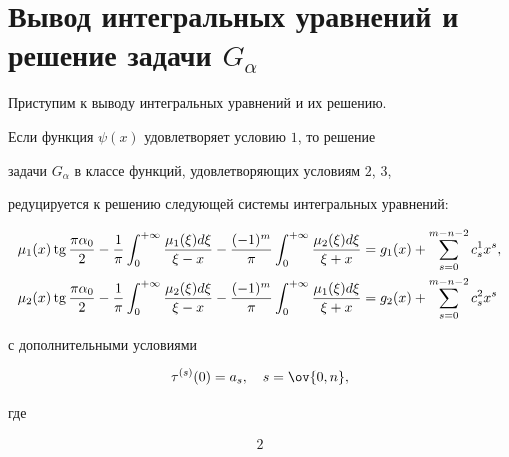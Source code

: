  


 


\section{Вывод интегральных уравнений и решение задачи $G_\alpha$} 


 


Приступим к выводу интегральных уравнений и их решению. 


 


 


\begin{thm} 


Если функция $\psi(x)$ удовлетворяет условию $1$, то решение 


задачи $G_\alpha$ в классе функций, удовлетворяющих условиям $2$, $3$, 


редуцируется к решению следующей системы интегральных уравнений\/${:}$


\begin{align} 


\mu_1(x)\tg\frac{\pi\alpha_0}{2}-\frac{1}{\pi} 


\int^{+\infty}_0\frac{\mu_1(\xi)d\xi}{\xi-x}- 


\frac{(-1)^m}{\pi}\int^{+\infty}_0 


\frac{\mu_2(\xi)d\xi}{\xi+x}&=g_1(x) 


+\sum^{m-n-2}_{s=0}c^1_s x^s,\\ 


% 


\mu_2(x)\tg\frac{\pi\alpha_0}{2}-\frac{1}{\pi} 


\int^{+\infty}_0\frac{\mu_2(\xi)d\xi}{\xi-x}- 


\frac{(-1)^m}{\pi}\int^{+\infty}_0 


\frac{\mu_1(\xi)d\xi}{\xi+x}&=g_2(x) 


+\sum^{m-n-2}_{s=0}c^2_s x^s


\end{align} 


с дополнительными условиями 


\begin{equation} 


\tau^{(s)}(0)=a_s,\quad s=\ov{0,n}, 


\end{equation} 


где 


\begin{alignat}{2} 



\end{alignat}
\end{thm}

